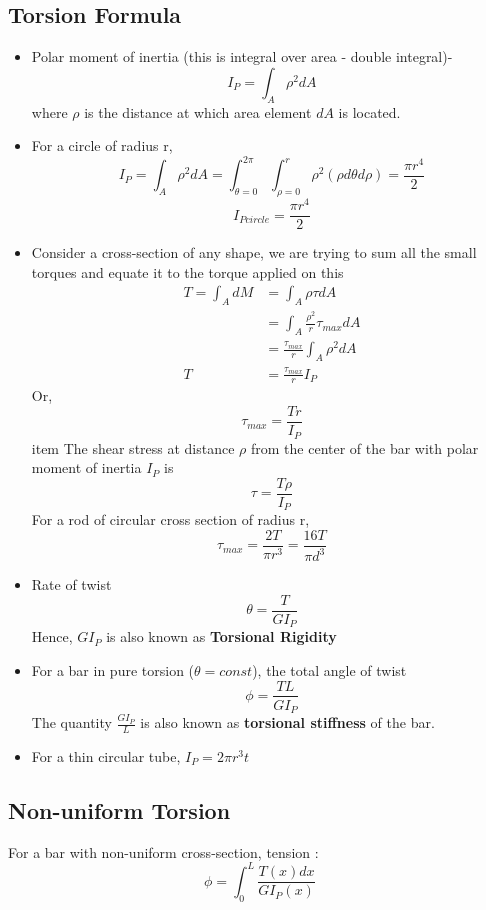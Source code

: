 \documentclass{article}
\begin{document}
	\subsection{Torsion Formula}
	\begin{itemize}
		\item Polar moment of inertia (this is integral over area - double integral)-
		\[\boxed{I_P = \int_A \rho^2 dA}\]
		where $\rho$ is the distance at which area element $dA$ is located.
		\item For a circle of radius r, 
		\[I_P = \int_A \rho^2 dA = \int_{\theta = 0}^{2\pi}\int_{\rho = 0}^r \rho^2 (\rho d\theta d\rho) = \frac{\pi r^4}{2} \]
		\[I_{Pcircle} = \frac{\pi r^4}{2}\]
		\item Consider a cross-section of any shape, we are trying to sum all the small torques and equate it to the torque applied on this
		\begin{align*}
			T = \int_A dM &= \int_A \rho \tau dA\\
						  &= \int_A \frac{\rho^2}{r}\tau_{max} dA\\
						  &= \frac{\tau_{max}}{r} \int_A \rho^2 dA\\
						T &= \frac{\tau_{max}}{r} I_P
		\end{align*}
		Or,
		\[\tau_{max} = \frac{Tr}{I_P}\]
		item The shear stress at distance $\rho$ from the center of the bar with polar moment of inertia $I_P$ is
		\[\boxed{\tau = \frac{T\rho}{I_P}}\]
		For a rod of circular cross section of radius r,
		\[\boxed{\tau_{max} = \frac{2T}{\pi r^3} = \frac{16T}{\pi d^3 }}\]

		\item Rate of twist
		\[\boxed{\theta = \frac{T}{GI_P}}\]
		Hence, $GI_P$ is also known as \textbf{Torsional Rigidity}
		\item For a bar in pure torsion ($\theta = const$), the total angle of twist
		\[\boxed{\phi = \frac{TL}{GI_P}}\]
		The quantity $\frac{G I_P}{L}$ is also known as \textbf{torsional stiffness} of the bar.

		\item For a thin circular tube, $I_P = 2 \pi r^3 t$
	\end{itemize}

	\subsection{Non-uniform Torsion}
		For a bar with non-uniform cross-section, tension  :
		\[\boxed{\phi = \int_0^L \frac{T(x) dx}{G I_P(x)}}\]
\end{document}
